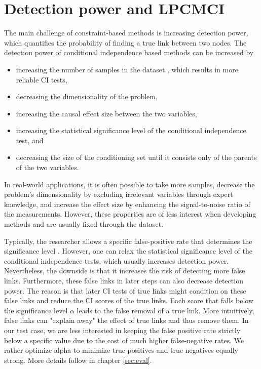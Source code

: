 \documentclass[conference]{IEEEtran}
\begin{document}
\section{Detection power and LPCMCI}
The main challenge of constraint-based methods is increasing detection power, which quantifies the probability of finding a true link between two nodes\cite{runge_pcmci_2019}.
The detection power of conditional independence based methods can be increased by
\begin{itemize}
    \item increasing the number of samples in the dataset \cite{gerhardus_high-recall_2021}, which results in more reliable CI tests,
    \item decreasing the dimensionality of the problem\cite{runge_pcmci_2019},
    \item increasing the causal effect size between the two variables\cite{gerhardus_high-recall_2021},
    \item increasing the statistical significance level of the conditional independence test\cite{gerhardus_high-recall_2021}, and
    \item decreasing the size of the conditioning set until it consists only of the parents of the two variables\cite{runge_pcmci_2019}.
\end{itemize}

In real-world applications, it is often possible to take more samples, decrease the problem's dimensionality by excluding irrelevant variables through expert knowledge, and increase the effect size by enhancing the signal-to-noise ratio of the measurements.
However, these properties are of less interest when developing methods and are usually fixed through the dataset.

Typically, the researcher allows a specific false-positive rate that determines the significance level \cite{gerhardus_high-recall_2021}.
However, one can relax the statistical significance level of the conditional independence tests, which usually increases detection power.
Nevertheless, the downside is that it increases the risk of detecting more false links.
Furthermore, these false links in later steps can also decrease detection power. The reason is that later CI tests of true links might condition on these false links and reduce the CI scores of the true links. Each score that falls below the significance level $\alpha$ leads to the false removal of a true link. More intuitively, false links can "explain away" the effect of true links and thus remove them.
In our test case, we are less interested in keeping the false positive rate strictly below a specific value due to the cost of much higher false-negative rates. We rather optimize alpha to minimize true positives and true negatives equally strong. More details follow in chapter \ref{sec:eval}.
\end{document}
